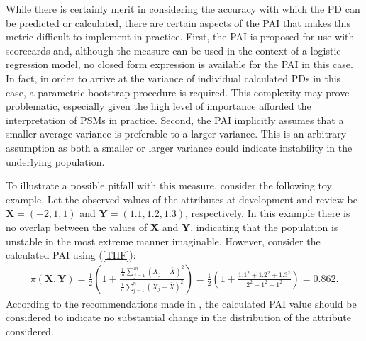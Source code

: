 \documentclass{article}
\theoremstyle{def}
\begin{document}
While there is certainly merit in considering the accuracy with which the PD can be predicted or calculated, there are certain aspects of the PAI that makes this metric difficult to implement in practice.
First, the PAI is proposed for use with scorecards and, although the measure can be used in the context of a logistic regression model, no closed form expression is available for the PAI in this case. In fact, in order to arrive at the variance of individual calculated PDs in this case, a parametric bootstrap procedure is required. This complexity may prove problematic, especially given the high level of importance afforded the interpretation of PSMs in practice.
Second, the PAI implicitly assumes that a smaller average variance is preferable to a larger variance. This is an arbitrary assumption as both a smaller or larger variance could indicate instability in the underlying population.

To illustrate a possible pitfall with this measure, consider the following toy example. Let the observed values of the attributes at development and review be $\textbf{X}=(-2,1,1)$ and $\textbf{Y}=(1.1,1.2,1.3)$, respectively. In this example there is no overlap between the values of $\textbf{X}$ and $\textbf{Y}$, indicating that the population is unstable in the most extreme manner imaginable. However, consider the calculated PAI using (\ref{THF}):
\begin{eqnarray*}
\pi(\mathbf{X},\mathbf{Y}) = \frac{1}{2} \left(1+\frac{\frac{1}{m}\sum_{j=1}^m(X_j-\bar X )^2}{\frac{1}{n}\sum_{j=1}^n(X_j-\bar X )^2}\right) = \frac{1}{2} \left(1+\frac{1.1^2 + 1.2^2+ 1.3^2}{2^2+1^2+1^2}\right) = 0.862.
\end{eqnarray*}
According to the recommendations made in \cite{TAPLINHUNT2019}, the calculated PAI value should be considered to indicate no substantial change in the distribution of the attribute considered.
\end{document}
